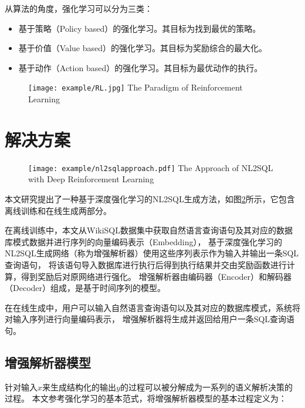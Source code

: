 从算法的角度，强化学习可以分为三类：
\begin{itemize}
  \item 基于策略（Policy based）的强化学习。其目标为找到最优的策略。
  \item 基于价值（Value based）的强化学习。其目标为奖励综合的最大化。
  \item 基于动作（Action based）的强化学习。其目标为最优动作的执行。
\end{itemize}
\begin{figure}[!htp]
  \centering
  \texttt{[image: example/RL.jpg]}
    {The Paradigm of Reinforcement Learning}
  \label{fig:RL}
\end{figure}



\section{解决方案}
\begin{figure}[!htp]
  \centering
  \texttt{[image: example/nl2sqlapproach.pdf]}
    {The Approach of NL2SQL with Deep Reinforcement Learning}
  \label{fig:nl2sqlapproach}
\end{figure}

本文研究提出了一种基于深度强化学习的NL2SQL生成方法，如图\ref{fig:nl2sqlapproach}所示，它包含离线训练和在线生成两部分。

在离线训练中，本文从WikiSQL数据集中获取自然语言查询语句及其对应的数据库模式数据并进行序列的向量编码表示（Embedding），
基于深度强化学习的NL2SQL生成网络（称为增强解析器）使用这些序列表示作为输入并输出一条SQL查询语句，
将该语句导入数据库进行执行后得到执行结果并交由奖励函数进行计算，得到奖励后对原网络进行强化。
增强解析器由编码器（Encoder）和解码器（Decoder）组成，是基于时间序列的模型。


在在线生成中，用户可以输入自然语言查询语句以及其对应的数据库模式，系统将对输入序列进行向量编码表示，
增强解析器将生成并返回给用户一条SQL查询语句。

\subsection{增强解析器模型}
\label{enl2sql:zqjxqmx}
针对输入$x$来生成结构化的输出$y$的过程可以被分解成为一系列的语义解析决策的过程。
本文参考强化学习的基本范式，将增强解析器模型的基本过程定义为：

